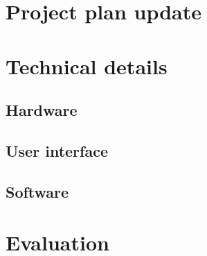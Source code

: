 \documentclass{article}
\begin{document}
 


\begin{abstract}

\end{abstract} 

\section{Project plan update} 

\section{Technical details}

\subsection{Hardware}

\subsection{User interface}

\subsection{Software}

\section{Evaluation}
\end{document}
